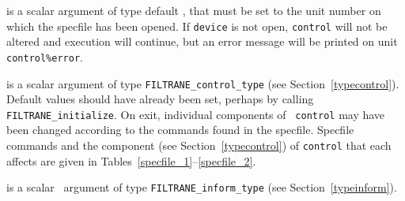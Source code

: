 \documentclass{galahad}
\newcommand{\packagename}{FILTRANE}
\begin{document}
\begin{description}
 is a scalar \intentin argument of type default \integer,
that must be set to the unit number on which the specfile
has been opened. If {\tt device} is not open, {\tt control} will
not be altered and execution will continue, but an error message
will be printed on unit {\tt control\%error}.

 is a scalar \intentinout argument of type
{\tt \packagename\_control\_type} (see Section~\ref{typecontrol}).
Default values should have already been set, perhaps by calling
{\tt \packagename\_initialize}. On exit, individual components of {\tt
control} may have been changed according to the commands found in the
specfile. Specfile commands and  the component (see Section~\ref{typecontrol})
of {\tt control}  that each affects are given in
Tables~\ref{specfile_1}--\ref{specfile_2}.

 is a scalar \intentout\ argument of type
{\tt \packagename\_inform\_type} (see Section~\ref{typeinform}).
\end{description}
\end{document}
